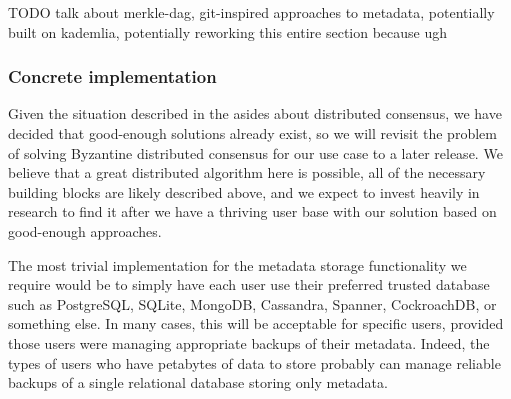 \documentclass[a4paper,10pt]{article} \usepackage[utf8]{inputenc}
\newcommand{\todo}[1]{{\color{red} TODO #1}}
\begin{document}

\todo{talk about merkle-dag, git-inspired approaches to metadata, potentially
built on kademlia, potentially reworking this entire section because ugh}

\subsubsection{Concrete implementation}

Given the situation described in the asides about distributed consensus, we have
decided that good-enough solutions already exist, so we will revisit the
problem of solving Byzantine distributed consensus for our use
case to a later release. We believe that a great distributed algorithm here is
possible, all of the necessary building blocks are likely described above, and
we expect to invest heavily in research to find it after we have a thriving user
base with our solution based on good-enough approaches.

The most trivial implementation for the metadata storage functionality we
require would be to simply have each user use their preferred trusted database
such as PostgreSQL, SQLite, MongoDB, Cassandra\cite{cassandra},
Spanner\cite{spanner}, CockroachDB, or something else. In many cases, this will
be acceptable for specific users, provided those users were managing appropriate
backups of their metadata. Indeed, the types of users who have petabytes of data
to store probably can manage reliable backups of a single relational database
storing only metadata.
\end{document}

